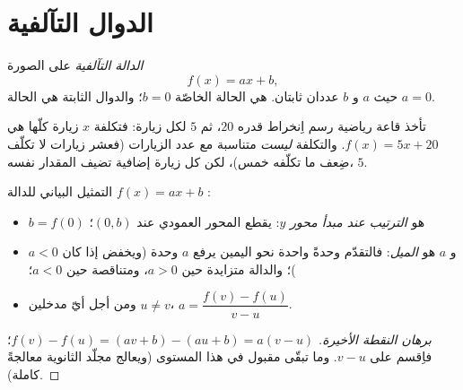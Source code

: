 \section{الدوال التآلفية}

\begin{definition}\label{def:g9:linfunc:affine}
\emph{الدالة التآلفية} على الصورة
\[
f(x) = a x + b ,
\]
حيث $a$ و $b$ عددان ثابتان.  هي الحالة الخاصّة
$b = 0$؛ والدوال الثابتة هي الحالة $a = 0$.
\end{definition}

\begin{example}
تأخذ قاعة رياضية رسم اِنخراط قدره $20$، ثم $5$ لكل زيارة: فتكلفة
$x$ زيارة كلّها هي $f(x) = 5x + 20$. والتكلفة \emph{ليست}
متناسبة مع عدد الزيارات (فعشر زيارات لا تكلّف ضِعف ما تكلّفه
خمس)، لكن كل زيارة إضافية تضيف المقدار نفسه، $5$.
\end{example}

\begin{proposition}\label{prop:g9:linfunc:affinegraph}
التمثيل البياني للدالة $f(x) = ax + b$ :
\begin{itemize}
  \item $b = f(0)$ هو \emph{الترتيب عند مبدأ محور $y$}: 
        يقطع المحور العمودي عند $(0, b)$؛
  \item و $a$ هو \emph{الميل}: فالتقدّم وحدةً واحدة
        نحو اليمين يرفع $a$ وحدة (ويخفض إذا كان $a < 0$)؛
        والدالة متزايدة حين $a > 0$، ومتناقصة حين $a < 0$؛
  \item ومن أجل أيّ مدخلين $u \neq v$،
        $a = \dfrac{f(v) - f(u)}{v - u}$.
\end{itemize}
\end{proposition}

\begin{proof}[برهان النقطة الأخيرة]
$f(v) - f(u) = (av + b) - (au + b) = a(v - u)$؛ فاِقسم على $v - u$.
وما تبقّى مقبول في هذا المستوى (ويعالج مجلّد الثانوية 
 معالجةً كاملة).
\end{proof}


